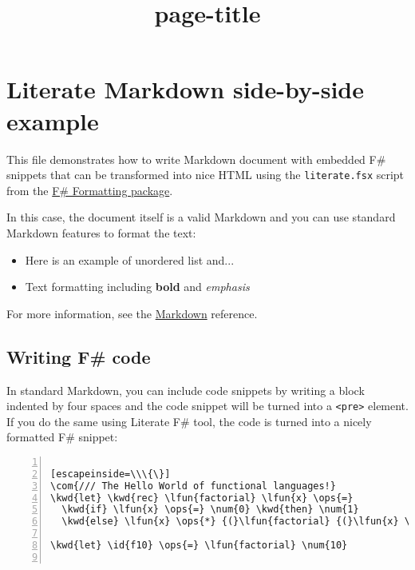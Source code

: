 \documentclass{article}
\title{{page-title}}
\date{}
\newcommand{\id}[1]{\textcolor{black}{#1}}
\newcommand{\com}[1]{\textcolor{officegreen}{#1}}
\newcommand{\kwd}[1]{\textcolor{navy}{#1}}
\newcommand{\num}[1]{\textcolor{officegreen}{#1}}
\newcommand{\ops}[1]{\textcolor{purple}{#1}}
\begin{document}
\maketitle

\section*{Literate Markdown side-by-side example}



This file demonstrates how to write Markdown document with
embedded F\# snippets that can be transformed into nice HTML
using the \texttt{literate.fsx} script from the \href{http://fsprojects.github.io/FSharp.Formatting}{F\# Formatting
package}.


In this case, the document itself is a valid Markdown and
you can use standard Markdown features to format the text:
\begin{itemize}
\item Here is an example of unordered list and...

\item Text formatting including \textbf{bold} and \emph{emphasis}

\end{itemize}



For more information, see the \href{http://daringfireball.net/projects/markdown}{Markdown} reference.
\subsection*{Writing F\# code}



In standard Markdown, you can include code snippets by
writing a block indented by four spaces and the code
snippet will be turned into a \texttt{<pre>} element. If you do
the same using Literate F\# tool, the code is turned into
a nicely formatted F\# snippet:
\begin{lstlisting}[numbers=left]

[escapeinside=\\\{\}]
\com{/// The Hello World of functional languages!}
\kwd{let} \kwd{rec} \lfun{factorial} \lfun{x} \ops{=} 
  \kwd{if} \lfun{x} \ops{=} \num{0} \kwd{then} \num{1} 
  \kwd{else} \lfun{x} \ops{*} {(}\lfun{factorial} {(}\lfun{x} \ops{-} \num{1}{)}{)}

\kwd{let} \id{f10} \ops{=} \lfun{factorial} \num{10}


\end{lstlisting}
\end{document}
